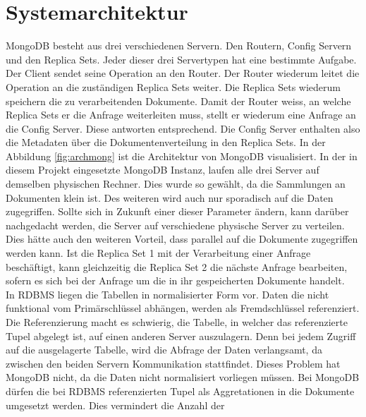  \section{Systemarchitektur}
 MongoDB besteht aus drei verschiedenen Servern. Den Routern, Config Servern und
 den Replica Sets. Jeder dieser drei Servertypen hat eine bestimmte Aufgabe.
 Der Client sendet seine Operation an den Router. Der Router wiederum leitet
 die Operation an die zuständigen Replica Sets weiter. Die Replica Sets wiederum 
 speichern die zu verarbeitenden Dokumente. Damit der Router weiss, an welche
 Replica Sets er die Anfrage weiterleiten muss, stellt er wiederum eine Anfrage
 an die Config Server. Diese antworten entsprechend. Die Config Server enthalten 
 also die Metadaten über die Dokumentenverteilung in den Replica Sets.
 In der Abbildung \ref{fig:archmong} ist die Architektur von MongoDB
 visualisiert.
 In der in diesem Projekt eingesetzte MongoDB Instanz, laufen alle drei Server
 auf demselben physischen Rechner. Dies wurde so gewählt, da die Sammlungen an
 Dokumenten klein ist. Des weiteren wird auch nur sporadisch auf die Daten
 zugegriffen. Sollte sich in Zukunft einer dieser Parameter ändern, kann darüber
 nachgedacht werden, die Server auf verschiedene physische Server zu
 verteilen. Dies hätte auch den weiteren Vorteil, dass parallel auf die
 Dokumente zugegriffen werden kann. Ist die Replica Set 1 mit der Verarbeitung
 einer Anfrage beschäftigt, kann gleichzeitig die Replica Set 2 die nächste
 Anfrage bearbeiten, sofern es sich bei der Anfrage um die in ihr gespeicherten
 Dokumente handelt. \\
 In RDBMS liegen die Tabellen in normalisierter Form vor. Daten die nicht
 funktional vom Primärschlüssel abhängen, werden als Fremdschlüssel
 referenziert. Die Referenzierung macht es schwierig, die Tabelle, in
 welcher das referenzierte Tupel abgelegt ist, auf einen anderen Server
 auszulagern. Denn bei jedem Zugriff auf die ausgelagerte Tabelle, wird die
 Abfrage der Daten verlangsamt, da zwischen den beiden Servern Kommunikation
 stattfindet. Dieses Problem hat MongoDB nicht, da die Daten nicht normalisiert
 vorliegen müssen. Bei MongoDB dürfen die bei RDBMS referenzierten Tupel als
 Aggretationen in die Dokumente umgesetzt werden. Dies vermindert die Anzahl der
